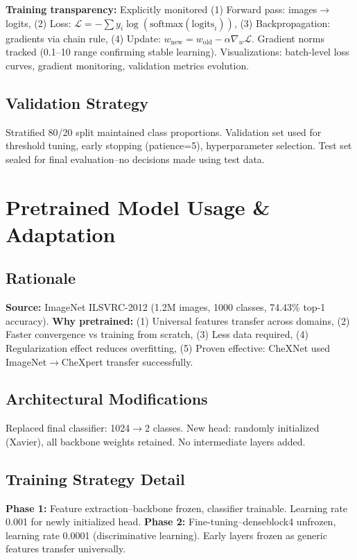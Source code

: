 \documentclass[12pt,a4paper]{article}
\begin{document}
\textbf{Training transparency:} Explicitly monitored (1) Forward pass: images$\rightarrow$logits, (2) Loss: $\mathcal{L}=-\sum y_i\log(\text{softmax}(\text{logits}_i))$, (3) Backpropagation: gradients via chain rule, (4) Update: $w_{\text{new}}=w_{\text{old}}-\alpha\nabla_w\mathcal{L}$. Gradient norms tracked (0.1--10 range confirming stable learning). Visualizations: batch-level loss curves, gradient monitoring, validation metrics evolution.

\subsection{Validation Strategy}
Stratified 80/20 split maintained class proportions. Validation set used for threshold tuning, early stopping (patience=5), hyperparameter selection. Test set sealed for final evaluation--no decisions made using test data.

\section{Pretrained Model Usage \& Adaptation}

\subsection{Rationale}
\textbf{Source:} ImageNet ILSVRC-2012 (1.2M images, 1000 classes, 74.43\% top-1 accuracy). \textbf{Why pretrained:} (1) Universal features transfer across domains, (2) Faster convergence vs training from scratch, (3) Less data required, (4) Regularization effect reduces overfitting, (5) Proven effective: CheXNet used ImageNet$\rightarrow$CheXpert transfer successfully.

\subsection{Architectural Modifications}
Replaced final classifier: 1024$\rightarrow$2 classes. New head: randomly initialized (Xavier), all backbone weights retained. No intermediate layers added.

\subsection{Training Strategy Detail}
\textbf{Phase 1:} Feature extraction--backbone frozen, classifier trainable. Learning rate 0.001 for newly initialized head. \textbf{Phase 2:} Fine-tuning--denseblock4 unfrozen, learning rate 0.0001 (discriminative learning). Early layers frozen as generic features transfer universally.
\end{document}
